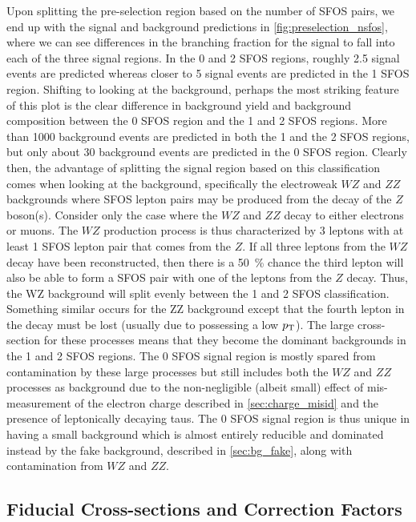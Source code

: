 Upon splitting the pre-selection region based on the number of SFOS
pairs, we end up with the signal and background predictions in
\fig\ref{fig:preselection_nsfos}, where we can see differences
in the branching fraction for the signal to fall into
each of the three signal regions.
In the 0 and 2 SFOS regions, roughly 2.5 signal events are predicted
whereas closer to 5 signal events are predicted in the 1 SFOS region.
Shifting to looking at the background, perhaps the most striking 
feature of this plot is the 
clear difference in background yield and background composition
between the 0 SFOS region and the 1 and 2 SFOS regions.
More than 1000 background events are predicted in both the 1 and
the 2 SFOS regions, but only about 30 background events are
predicted in the 0 SFOS region.
Clearly then, the advantage of splitting the signal region based on this
classification comes when looking at the background, specifically the
electroweak $WZ$ and $ZZ$ backgrounds where SFOS lepton pairs may be
produced from the decay of the $Z$ boson(s). Consider only the case
where the $WZ$ and $ZZ$ decay to either electrons or muons.  The $WZ$ production
process is thus characterized by 3 leptons with at least 1 SFOS lepton pair
that comes from the $Z$. If all three leptons from the $WZ$ decay have been
reconstructed, then there is a 50~\% chance the third lepton 
will also be able to form a SFOS pair with one of the leptons from the $Z$ decay.
Thus, the WZ background will split evenly between the 1 and 2 SFOS classification.
Something similar occurs for the ZZ background except that the fourth lepton 
in the decay must be lost (usually due to possessing a low $p_{\mathrm{T}}$).
The large cross-section for these processes means that
they become the dominant backgrounds in the 1 and 2 SFOS regions.  
The 0 SFOS signal region is mostly spared from contamination  by 
these large processes but still
includes both the $WZ$ and $ZZ$ processes as background due to the
non-negligible (albeit small) effect of mis-measurement of the electron
charge described in \sec\ref{sec:charge_misid} and the presence
of leptonically decaying taus.  The 0 SFOS signal region
is thus unique in having a small background which is almost entirely
reducible and dominated instead by the fake background,
described in \sec\ref{sec:bg_fake},
along with contamination from $WZ$ and $ZZ$. 
\FloatBarrier


\FloatBarrier




\subsection{Fiducial Cross-sections and Correction Factors}
\label{sec:inputs}

